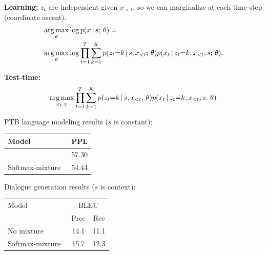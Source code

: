 \begin{frame}
\textbf{Learning:} $z_t$ are independent given $x_{<t}$, so we can marginalize at each time-step (coordinate ascent).
    \begin{align*}
        &\argmax_{\theta} \log p(x \given s \param \theta) =  \\
        &\argmax_{\theta} \log \prod_{t=1}^T \sum_{k=1}^K p(z_t {=} k \given s, x_{<t} \param \theta) p(x_t \given z_t{=}k, x_{<t}, s \param \theta).
    \end{align*}

\textbf{Test-time:}
\begin{align*}
\argmax_{x_{1:T}} \prod_{t=1}^T \sum_{k=1}^K p(z_t {=} k \given s, x_{<t} \param \theta) p(x_t \given z_t{=}k, x_{<t}, s \param \theta)
\end{align*}
\end{frame}

\begin{frame}
PTB language modeling results ($s$ is constant):
\air
\begin{table}
\begin{tabular}{lc}
\toprule
     Model & PPL \\
\midrule     
     \citet{merity2018regularizing} & 57.30 \\
     Softmax-mixture~\citep{yang2018breaking} & 54.44 \\
\bottomrule
\end{tabular}  
\end{table}

\air
\air
        
Dialogue generation results ($s$ is context):
\air
\begin{table}
\begin{tabular}{lcc}
\toprule
     Model &  \multicolumn{2}{c}{BLEU} \\
     & Prec & Rec \\
\midrule     
     No mixture & 14.1 & 11.1 \\
     Softmax-mixture~\citep{yang2018breaking} & 15.7 & 12.3 \\
\bottomrule
\end{tabular}
\end{table}
    
\end{frame}

